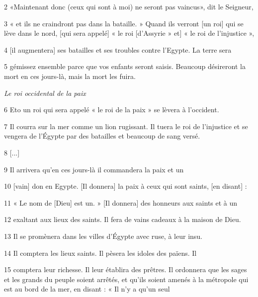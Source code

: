 \par 2 «Maintenant donc (ceux qui sont à moi) ne seront pas vaincus», dit le Seigneur,

\par 3 « et ils ne craindront pas dans la bataille. » Quand ils verront [un roi] qui se lève dans le nord, [qui sera appelé] « le roi [d’Assyrie » et] « le roi de l’injustice »,

\par 4 [il augmentera] ses batailles et ses troubles contre l'Egypte. La terre sera

\par 5 gémissez ensemble parce que vos enfants seront saisis. Beaucoup désireront la mort en ces jours-là, mais la mort les fuira.

\par \textit{Le roi occidental de la paix}

\par 6 Eto un roi qui sera appelé « le roi de la paix » se lèvera à l'occident.

\par 7 Il courra sur la mer comme un lion rugissant. Il tuera le roi de l'injustice et se vengera de l'Égypte par des batailles et beaucoup de sang versé.

\par 8 [...]

\par 9 Il arrivera qu'en ces jours-là il commandera la paix et un

\par 10 [vain] don en Egypte. [Il donnera] la paix à ceux qui sont saints, [en disant] :

\par 11 « Le nom de [Dieu] est un. » [Il donnera] des honneurs aux saints et à un

\par 12 exaltant aux lieux des saints. Il fera de vains cadeaux à la maison de Dieu.

\par 13 Il se promènera dans les villes d'Égypte avec ruse, à leur insu.

\par 14 Il comptera les lieux saints. Il pèsera les idoles des païens. Il

\par 15 comptera leur richesse. Il leur établira des prêtres. Il ordonnera que les sages et les grands du peuple soient arrêtés, et qu'ils soient amenés à la métropole qui est au bord de la mer, en disant : « Il n'y a qu'un seul

